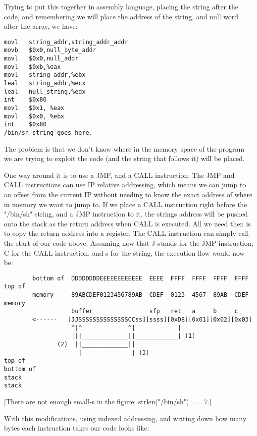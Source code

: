 \documentclass[10pt]{article}
\begin{document}
\begin{CJK}{UTF8}{bsmi}
Trying to put this together in assembly language, placing the string after the code, and remembering we will 
place the address of the string, and null word after the array, we have:

\begin{verbatim}
movl   string_addr,string_addr_addr
movb   $0x0,null_byte_addr
movl   $0x0,null_addr
movl   $0xb,%eax
movl   string_addr,%ebx
leal   string_addr,%ecx
leal   null_string,%edx
int    $0x80
movl   $0x1, %eax
movl   $0x0, %ebx
int    $0x80
/bin/sh string goes here.
\end{verbatim}

The problem is that we don't know where in the memory space of the program we are trying to exploit the code 
(and the string that follows it) will be placed.

One way around it is to use a JMP, and a CALL instruction. The 
JMP and CALL instructions can use IP relative addressing, which means we can jump to an offset from the 
current IP without needing to know the exact address of where  in memory we want to jump to. If we place a 
CALL instruction right before the "/bin/sh" string, and a JMP instruction to it, the strings address will be 
pushed onto the stack as the return address when CALL is executed. All we need then is to copy the return 
address into a register. The CALL instruction can simply call the start of our code above. Assuming now that J 
stands for the JMP instruction, C for the CALL instruction, and s for the string, the execution flow would now 
be: 

{\tiny
\begin{verbatim}
        bottom of  DDDDDDDDEEEEEEEEEEEE  EEEE  FFFF  FFFF  FFFF  FFFF     top of
        memory     89ABCDEF0123456789AB  CDEF  0123  4567  89AB  CDEF     memory
                   buffer                sfp   ret   a     b     c
        <------   [JJSSSSSSSSSSSSSSCCss][ssss][0xD8][0x01][0x02][0x03]
                   ^|^             ^|            |
                   |||_____________||____________| (1)
               (2)  ||_____________||
                     |______________| (3)
top of                                                                 bottom of
stack                                                                  stack
\end{verbatim}
}

[There are not enough small-s in the figure; strlen("/bin/sh") == 7.] 

With this modifications, using indexed addressing, and writing down how many bytes each instruction takes our code looks like: 


\end{CJK}
\end{document}
